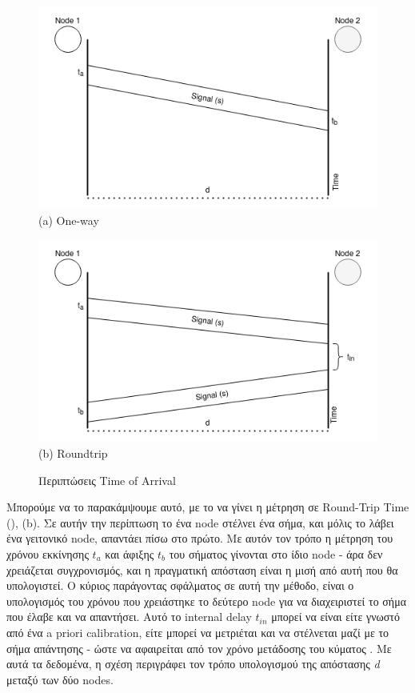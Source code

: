 \begin{figure} [H]
    \centering
    \begin{minipage}{.5\textwidth}
      \centering
      \includegraphics[width=.8\linewidth]{../Photos/toa-oneway.png}\\
      {(a) One-way}
    \end{minipage}%
    \begin{minipage}{.5\textwidth}
      \centering
      \includegraphics[width=.8\linewidth]{../Photos/toa-roundtrip.png}\\
      {(b) Roundtrip}
    \end{minipage}
    \hfill \break
    \decoRule
    \caption[Περιπτώσεις Time of Arrival]{Περιπτώσεις Time of Arrival} %
    \label{fig:Time-of-Arrival-cases}
\end{figure}

Μπορούμε να το παρακάμψουμε αυτό, με το να γίνει η μέτρηση σε Round-Trip Time (),  (b).
Σε αυτήν την περίπτωση το ένα node στέλνει ένα σήμα, και μόλις το λάβει ένα γειτονικό node, απαντάει πίσω στο πρώτο. 
Με αυτόν τον τρόπο η μέτρηση του χρόνου εκκίνησης $t_a$ και άφιξης $t_b$ του σήματος γίνονται στο ίδιο node - 
άρα δεν χρειάζεται συγχρονισμός, και η πραγματική απόσταση είναι η μισή από αυτή που θα υπολογιστεί. Ο κύριος παράγοντας
σφάλματος σε αυτή την μέθοδο, είναι ο υπολογισμός του χρόνου που χρειάστηκε το δεύτερο node για να διαχειριστεί
το σήμα που έλαβε και να απαντήσει. Αυτό το internal delay $t_{in}$ μπορεί να είναι είτε γνωστό από 
ένα a priori calibration, είτε μπορεί να μετριέται και να στέλνεται μαζί με το σήμα απάντησης - ώστε να αφαιρείται
από τον χρόνο μετάδοσης του κύματος \cite{wsn-Localization-techniques}.
Με αυτά τα δεδομένα, η σχέση  περιγράφει τον τρόπο υπολογισμού της
απόστασης \emph{d} μεταξύ των δύο nodes.

